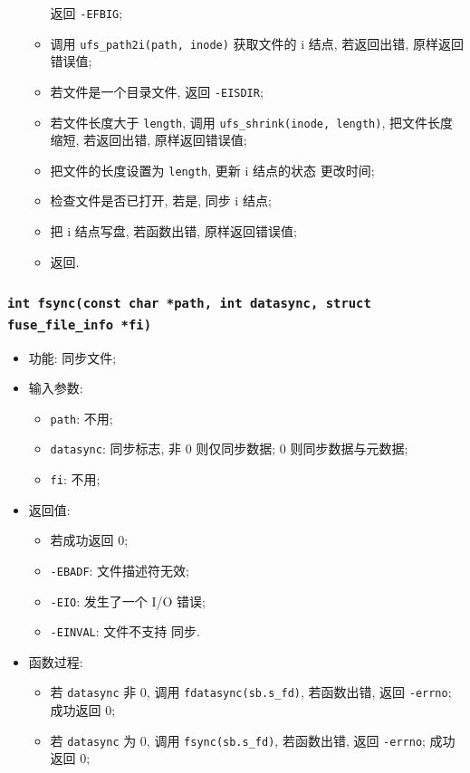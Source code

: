 \documentclass[nofonts, titlepage]{ctexart}
\begin{document}
\begin{itemize}
\begin{itemize}
                    返回 \verb'-EFBIG';
                \item 调用 \verb'ufs_path2i(path, inode)' 获取文件的 i 
                    结点, 若返回出错, 原样返回错误值;
                \item 若文件是一个目录文件, 返回 \verb'-EISDIR';
                \item 若文件长度大于 \verb'length', 调用
                    \verb'ufs_shrink(inode, length)', 把文件长度缩短,
                    若返回出错, 原样返回错误值;
                \item 把文件的长度设置为 \verb'length', 更新 i 结点的状态
                    更改时间;
                \item 检查文件是否已打开, 若是, 同步 i 结点;
                \item 把 i 结点写盘, 若函数出错, 原样返回错误值;
                \item 返回.
            \end{itemize}
      \end{itemize}

  \subsubsection[\texttt{fsync}]{\texttt{int fsync(const char *path, int datasync, struct fuse\_file\_info *fi)}}

  \begin{itemize}
\item
  功能: 同步文件;
\item
  输入参数:

  \begin{itemize}
  \item
    \texttt{path}: 不用;
  \item
    \texttt{datasync}: 同步标志, 非 0 则仅同步数据; 0
    则同步数据与元数据;
  \item
    \texttt{fi}: 不用;
  \end{itemize}
\item
  返回值:

  \begin{itemize}
  \item
    若成功返回 0;
  \item
    \texttt{-EBADF}: 文件描述符无效;
  \item
    \texttt{-EIO}: 发生了一个 I/O 错误;
  \item
    \texttt{-EINVAL}: 文件不支持 同步.
  \end{itemize}
\item
  函数过程:

  \begin{itemize}
  \item
    若 \texttt{datasync} 非 0, 调用 \texttt{fdatasync(sb.s\_fd)},
    若函数出错, 返回 \texttt{-errno}; 成功返回 0;
  \item
    若 \texttt{datasync} 为 0, 调用 \texttt{fsync(sb.s\_fd)},
    若函数出错, 返回 \texttt{-errno}; 成功返回 0;
  \end{itemize}
\end{itemize}
\end{document}
